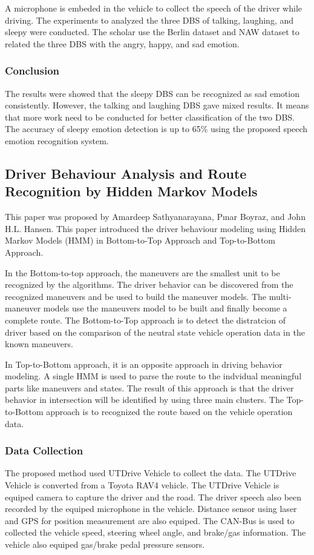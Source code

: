 A microphone is embeded in the vehicle to collect the speech of the driver while driving. The experiments to analyzed the three DBS of talking, laughing, and sleepy were conducted. The scholar use the Berlin dataset and NAW dataset to related the three DBS with the angry, happy, and sad emotion.

\subsubsection{Conclusion}
The results were showed that the sleepy DBS can be recognized as sad emotion consistently. However, the talking and laughing DBS gave mixed results. It means that more work need to be conducted for better classification of the two DBS. The accuracy of sleepy emotion detection is up to 65\% using the proposed speech emotion recognition system.

\subsection{Driver Behaviour Analysis and Route Recognition by Hidden Markov Models}
This paper was proposed by Amardeep Sathyanarayana, Pınar Boyraz, and John H.L. Hansen. This paper introduced the driver behaviour modeling using Hidden Markov Models (HMM) in Bottom-to-Top Approach and Top-to-Bottom Approach.

In the Bottom-to-top approach, the maneuvers are the smallest unit to be recognized by the algorithms. The driver behavior can be discovered from the recognized maneuvers and be used to build the maneuver models. The multi-maneuver models use the maneuvers model to be built and finally become a complete route. The Bottom-to-Top approach is to detect the distratcion of driver based on the comparison of the neutral state vehicle operation data in the known maneuvers.

In Top-to-Bottom approach, it is an opposite approach in driving behavior modeling. A single HMM is used to parse the route to the indvidual meaningful parts like maneuvers and states. The result of this approach is that the driver behavior in intersection will be identified by using three main clusters. The Top-to-Bottom approach is to recognized the route based on the vehicle operation data.

\subsubsection{Data Collection}
The proposed method used UTDrive Vehicle to collect the data. The UTDrive Vehicle is converted from a Toyota RAV4 vehicle. The UTDrive Vehicle is equiped camera to capture the driver and the road. The driver speech also been recorded by the equiped microphone in the vehicle. Distance sensor using laser and GPS for position measurement are also equiped. The CAN-Bus is used to collected the vehicle speed, steering wheel angle, and brake/gas information. The vehicle also equiped gas/brake pedal pressure sensors. 

